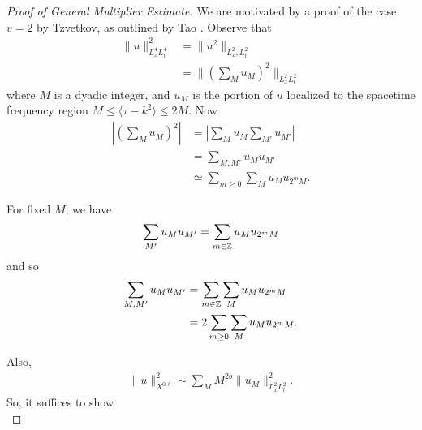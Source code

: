 \begin{proof}[Proof of General Multiplier Estimate]
  We are motivated by a proof of the case $v=2$ by Tzvetkov, as outlined by Tao \cite{Tao-2006-Nonlinear-dispersive-equations}. Observe that
  \begin{equation*}
  \begin{split}
    \| u \|_{L^{4}_{x}L^{4}_{t}}^{2} 
    &= \| u^{2} \|_{L^{2}_{x}, L^{2}_{t}}
    \\
    & = \| (\sum_{M}u_{M})^{2} \|_{L^{2}_{x}L^{2}_{t}}
  \end{split}
  \end{equation*}
  where $M$ is a dyadic integer, and $u_{M}$ is the portion of $u$ localized to the spacetime frequency region $M \le \langle \tau - k^{2} \rangle \le 2M$. Now 
  \begin{equation*}
  \begin{split}
    | \left( \sum_{M} u_{M} \right)^{2} |
    & = | \sum_{M} u_{M} \sum_{M'}u_{M'} |
    \\
    & = \sum_{M, M'} u_{M} u_{M'}
    \\
    & \simeq \sum_{m \ge 0} \sum_{M} u_{M}u_{2^{m}M}.
  \end{split}
  \end{equation*}
  \begin{framed}
For fixed $M$, we have
  \begin{equation*}
  \begin{split}
    \sum_{M'} u_{M} u_{M'} = \sum_{m \in \mathbb{Z}} u_{M} u_{2^{m}M}
  \end{split}
  \end{equation*}
  and so
  \begin{equation*}
  \begin{split}
    \sum_{M, M'} u_{M}u_{M'}
    & = \sum_{m \in \mathbb{Z}} \sum_{M} u_{M} u_{2^{m}M}
    \\
    & = 2 \sum_{m \ge 0} \sum_{M} u_{M}u_{2^{m}M}.
  \end{split}
  \end{equation*}
\end{framed}
  Also,
  \begin{equation*}
  \begin{split}
    \| u \|^{2}_{X^{0, b}} \sim \sum_{M} M^{2b} \| u_{M} \|^{2}_{L^{2}_{x}L^{2}_{t}}.
  \end{split}
  \end{equation*}
  So, it suffices to show
%
%
\begin{equation*}

\end{equation*}
\end{proof}
